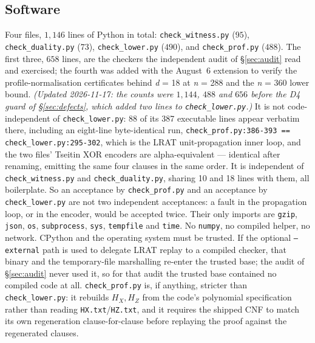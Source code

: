 \documentclass[11pt]{amsart}
\newcommand{\HX}{H_{X}}
\newcommand{\HZ}{H_{Z}}
\theoremstyle{plain}
\theoremstyle{definition}
\theoremstyle{remark}
\begin{document}
\subsection{Software}
Four files, $1{,}146$ lines of Python in total:
\texttt{check\_witness.py} ($95$), \texttt{check\_duality.py} ($73$),
\texttt{check\_lower.py} ($490$), and \texttt{check\_prof.py} ($488$). The
first three, $658$ lines, are the checkers the independent audit of
\S\ref{sec:audit} read and exercised; the fourth was added with the August~6 extension to verify the
profile-normalisation certificates behind \emph{d} = 18 at \emph{n} = 288
and the \emph{n} = 360 lower bound. \emph{(Updated 2026-11-17: the counts
were $1{,}144$, $488$ and $656$ before the D4 guard of \S\ref{sec:defects},
which added two lines to \texttt{check\_lower.py}.)} It is not code-independent of
\texttt{check\_lower.py}: 88 of its 387 executable lines appear verbatim
there, including an eight-line byte-identical run,
\texttt{check\_prof.py:386-393 == check\_lower.py:295-302}, which is the
LRAT unit-propagation inner loop, and the two files' Tseitin XOR encoders
are alpha-equivalent --- identical after renaming, emitting the same four
clauses in the same order. It is independent of \texttt{check\_witness.py}
and \texttt{check\_duality.py}, sharing 10 and 18 lines with them, all
boilerplate. So an acceptance by \texttt{check\_prof.py} and an acceptance
by \texttt{check\_lower.py} are not two independent acceptances: a fault in
the propagation loop, or in the encoder, would be accepted twice.
Their only imports are \texttt{gzip}, \texttt{json}, \texttt{os},
\texttt{subprocess}, \texttt{sys}, \texttt{tempfile} and \texttt{time}. No
\texttt{numpy}, no compiled helper, no network. CPython and the operating
system must be trusted. If the optional \texttt{--external} path is used to
delegate LRAT replay to a compiled checker, that binary and the temporary-file
marshalling re-enter the trusted base; the audit of \S\ref{sec:audit} never
used it, so for that audit the trusted base contained no compiled code at all.
\texttt{check\_prof.py} is, if anything, stricter than \texttt{check\_lower.py}:
it rebuilds $\HX,\HZ$ from the code's polynomial specification rather than
reading \texttt{HX.txt}/\texttt{HZ.txt}, and it requires the shipped CNF to
match its own regeneration clause-for-clause before replaying the proof against
the regenerated clauses.
\end{document}

